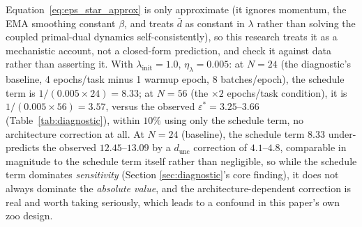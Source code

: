 \documentclass[11pt]{article}
\newcommand{\eps}{\varepsilon}
\newcommand{\epsstar}{\eps^{*}}
\begin{document}
Equation~\ref{eq:eps_star_approx} is only approximate (it ignores momentum,
the EMA smoothing constant $\beta$, and treats $\bar d$ as constant in
$\lambda$ rather than solving the coupled primal-dual dynamics
self-consistently), so this research treats it as a mechanistic account, not a closed-form
prediction, and check it against data rather than asserting it. With
$\lambda_{\mathrm{init}}=1.0$, $\eta_\lambda=0.005$: at $N=24$ (the diagnostic's
baseline, 4 epochs/task minus 1 warmup epoch, 8 batches/epoch), the schedule
term is $1/(0.005\times24)=8.33$; at $N=56$ (the $\times2$ epochs/task
condition), it is $1/(0.005\times56)=3.57$, versus the observed
$\epsstar=3.25$--$3.66$ (Table~\ref{tab:diagnostic}), within $10\%$ using
only the schedule term, no architecture correction at all. At $N=24$
(baseline), the schedule term $8.33$ under-predicts the observed
$12.45$--$13.09$ by a $d_{\mathrm{unc}}$ correction of $4.1$--$4.8$,
comparable in magnitude to the schedule term itself rather than negligible,
so while the schedule term dominates \emph{sensitivity} (Section
\ref{sec:diagnostic}'s core finding), it does not always dominate the
\emph{absolute value}, and the architecture-dependent correction is real and
worth taking seriously, which leads to a confound in this paper's own zoo design.
\end{document}
